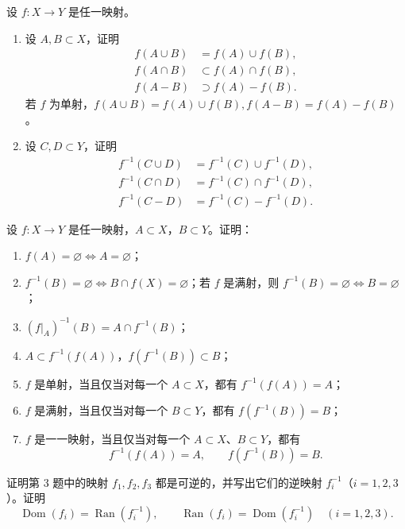 \begin{exercise}
  \item 设 \(f:X\to Y\) 是任一映射。
  \begin{enumerate}[label=\arabic*)]
    \item 设 \(A,B\subset X\)，证明
    \begin{align*}
      f(A\cup B)&=f(A)\cup f(B),\\
      f(A\cap B)&\subset f(A)\cap f(B),\\
      f(A-B)&\supset f(A)-f(B).
    \end{align*}
    若 \(f\) 为单射，$f(A\cup B)=f(A)\cup f(B), f(A-B) = f(A)-f(B)$。
    \item 设 \(C,D\subset Y\)，证明
    \begin{align*}
      f^{-1}(C\cup D)&=f^{-1}(C)\cup f^{-1}(D),\\
      f^{-1}(C\cap D)&=f^{-1}(C)\cap f^{-1}(D),\\
      f^{-1}(C-D)&=f^{-1}(C)-f^{-1}(D).
    \end{align*}
  \end{enumerate}
\end{exercise}

\begin{exercise}
  \item 设 \(f:X\to Y\) 是任一映射，\(A\subset X\)，\(B\subset Y\)。证明：
  \begin{enumerate}[label=\arabic*)]
    \item \(f(A)=\varnothing\iff A=\varnothing\)；
    \item \(f^{-1}(B)=\varnothing\iff B\cap f(X)=\varnothing\)；若 \(f\) 是满射，则
    \(f^{-1}(B)=\varnothing\iff B=\varnothing\)；
    \item \((f|_A)^{-1}(B)=A\cap f^{-1}(B)\)；
    \item \(A\subset f^{-1}(f(A))\)，\(f(f^{-1}(B))\subset B\)；
    \item \(f\) 是单射，当且仅当对每一个 \(A\subset X\)，都有 \(f^{-1}(f(A))=A\)；
    \item \(f\) 是满射，当且仅当对每一个 \(B\subset Y\)，都有 \(f(f^{-1}(B))=B\)；
    \item \(f\) 是一一映射，当且仅当对每一个 \(A\subset X\)、\(B\subset Y\)，都有
    \[
    f^{-1}(f(A))=A,\qquad f(f^{-1}(B))=B.
    \]
  \end{enumerate}
\end{exercise}

\begin{exercise}
  \item 证明第 3 题中的映射 \(f_1,f_2,f_3\) 都是可逆的，并写出它们的逆映射 \(f_i^{-1}\)（\(i=1,2,3\)）。证明
  \[
  \operatorname{Dom}(f_i)=\operatorname{Ran}(f_i^{-1}),\qquad
  \operatorname{Ran}(f_i)=\operatorname{Dom}(f_i^{-1})
  \quad(i=1,2,3).
  \]
\end{exercise}

